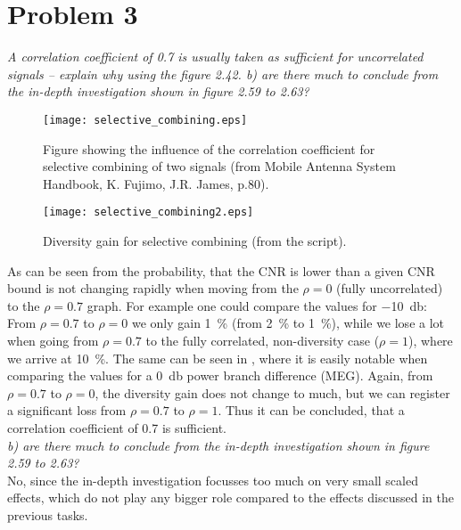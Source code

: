 \section{Problem 3}
\textit{A correlation coefficient of 0.7 is usually taken as sufficient for uncorrelated signals – explain why using the figure 2.42. b) are there much to conclude from the in-depth investigation shown in figure 2.59 to 2.63?}\\

\begin{figure}[!h]
  \centering
  \texttt{[image: selective\_combining.eps]}
  \caption{Figure showing the influence of the correlation coefficient for selective combining of two signals (from Mobile Antenna System Handbook, K. Fujimo, J.R. James, p.80).}
  \label{fig:selective_combining}
\end{figure}

\begin{figure}[!h]
  \centering
  \texttt{[image: selective\_combining2.eps]}
  \caption{Diversity gain for selective combining (from the script).}
  \label{fig:selective_combining2}
\end{figure}

As can be seen from  the probability, that the CNR is lower than a given CNR bound is not changing rapidly when moving from the $\rho=0$ (fully uncorrelated) to the $\rho=0.7$ graph. For example one could compare the values for \SI{-10}{\decibel}: From $\rho=0.7$ to $\rho=0$ we only gain \SI{1}{\percent} (from \SI{2}{\percent} to \SI{1}{\percent}), while we lose a lot when going from $\rho=0.7$ to the fully correlated, non-diversity case ($\rho=1$), where we arrive at \SI{10}{\percent}. The same can be seen in , where it is easily notable when comparing the values for a \SI{0}{\decibel} power branch difference (MEG). Again, from $\rho=0.7$ to $\rho=0$, the diversity gain does not change to much, but we can register a significant loss from $\rho=0.7$ to $\rho=1$. Thus it can be concluded, that a correlation coefficient of 0.7 is sufficient. \\


\textit{b) are there much to conclude from the in-depth investigation shown in figure 2.59 to 2.63?}\\

No, since the in-depth investigation focusses too much on very small scaled effects, which do not play any bigger role compared to the effects discussed in the previous tasks.